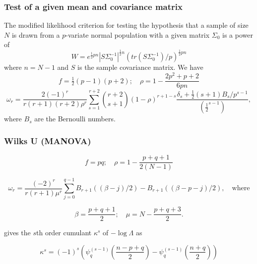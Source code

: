 \subsubsection{Test of a given mean and covariance matrix}
The modified likelihood criterion for testing the hypothesis that a sample of size $N$ is drawn from a $p$-variate normal population with a given matrix $\Sigma_0$ is a power of
\begin{equation}
	W = e^{\tfrac{1}{2}pn} |S \Sigma_0^{-1}|^{\tfrac{1}{2}n} \left(tr(S \Sigma_0^{-1})/p \right)^{\tfrac{1}{2}pn}
\end{equation}
where $n=N-1$ and $S$ is the sample covariance matrix. We have
\begin{equation}
	f=\tfrac{1}{2}(p-1)(p+2); \quad \rho=1-\frac{2p^2+p+2}{6pn}
\end{equation}
\begin{equation}
	\omega_r = \frac{2(-1)^r}{r(r+1)(r+2) \rho^r} \sum_{s=1}^{r+2} \binom{r+2}{s+1} (1-\rho)^{r+1-s} \frac{\delta_s + \tfrac{1}{2}(s+1) B_s / p^{s-1}}{(\tfrac{1}{2}^{s-1})}, 
\end{equation}
where $B_s$ are the Bernoulli numbers.




\subsubsection{Wilks U (MANOVA)}
\label{Box Expansion for Wilks U}

\begin{equation}
	f=pq; \quad \rho=1-\frac{p+q+1}{2(N-1)}
\end{equation}

\begin{equation}
	\omega_r = \frac{(-2)^r}{r(r+1) \mu^r} \sum_{j=0}^{q-1}{B_{r+1}((\beta -j)/2) - B_{r+1}((\beta -p-j)/2)}, \quad \text{where}
\end{equation}

\begin{equation}
	\beta=\frac{p+q+1}{2}; \quad \mu=N-\frac{p+q+3}{2}.
\end{equation}

\cite{Wakaki_2006} gives the $s$th order cumulant $\kappa^{s}$ of $-\log \Lambda$ as

\begin{equation}
	\kappa^{s} = \left(-1\right)^s \left(\psi_q^{(s-1)} \left(\frac{n-p+q}{2}\right)  -  \psi_q^{(s-1)} \left(\frac{n+q}{2}\right)   \right)  
\end{equation}






